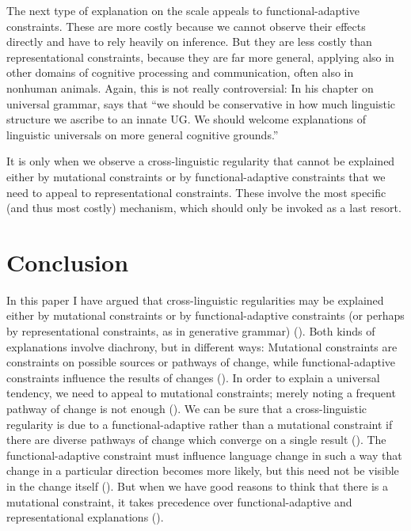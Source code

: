 \documentclass[output=paper]{langsci/langscibook}
\begin{document}
The next type of explanation on the scale appeals to functional-adaptive constraints. These are more costly because we cannot observe their effects directly and have to rely heavily on inference. But they are less costly than representational constraints, because they are far more general, applying also in other domains of cognitive processing and communication, often also in nonhuman animals. Again, this is not really controversial: In his chapter on universal grammar, \citet[79]{Jackendoff2002} says that “we should be conservative in how much linguistic structure we ascribe to an innate UG. We should welcome explanations of linguistic universals on more general cognitive grounds.”

It is only when we observe a cross-linguistic regularity that cannot be explained either by mutational constraints or by functional-adaptive constraints that we need to appeal to representational constraints. These involve the most specific (and thus most costly) mechanism, which should only be invoked as a last resort.

\section{Conclusion}\label{sec:haspelmath:8}

In this paper I have argued that cross-linguistic regularities may be explained either by mutational constraints or by functional-adaptive constraints (or perhaps by representational constraints, as in generative grammar) (). Both kinds of explanations involve diachrony, but in different ways: Mutational constraints are constraints on possible sources or pathways of change, while functional-adaptive constraints influence the results of changes (). In order to explain a universal tendency, we need to appeal to mutational constraints; merely noting a frequent pathway of change is not enough (). We can be sure that a cross-linguistic regularity is due to a functional-adaptive rather than a mutational constraint if there are diverse pathways of change which converge on a single result (). The functional-adaptive constraint must influence language change in such a way that change in a particular direction becomes more likely, but this need not be visible in the change itself (). But when we have good reasons to think that there is a mutational constraint, it takes precedence over functional-adaptive and representational explanations ().
\end{document}

